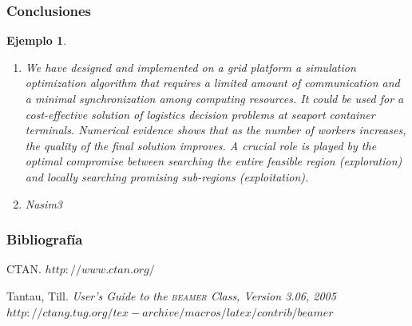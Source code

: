 \documentclass{beamer}
\newcommand{\beamer}{\textsc{beamer}}
\newtheorem{ejemplo}{Ejemplo}
\begin{document}
\begin{frame}
\frametitle{Conclusiones}

\begin{ejemplo}
  \begin{enumerate}
    \item
      We have designed and implemented on a grid platform a simulation optimization algorithm that requires a
limited amount of communication and a minimal synchronization among computing resources. It could be
used for a cost-effective solution of logistics decision problems at seaport container terminals. Numerical evidence
shows that as the number of workers increases, the quality of the final solution improves. A crucial role
is played by the optimal compromise between searching the entire feasible region (exploration) and locally
searching promising sub-regions (exploitation).
      \pause
    \item
  Nasim3
  \end{enumerate}
\end{ejemplo}

\end{frame}

\begin{frame}
  \frametitle{Bibliografía}

  \begin{thebibliography}{10}

    \beamertemplatebookbibitems
    CTAN. {\small $http://www.ctan.org/$}

    \beamertemplatebookbibitems
    Tantau, Till. 
    \emph{User's Guide to the \beamer{} Class, Version 3.06, 2005} 
    {\small $http://ctang.tug.org/tex-archive/macros/latex/contrib/beamer$}


  \end{thebibliography}
\end{frame}


\end{document}
